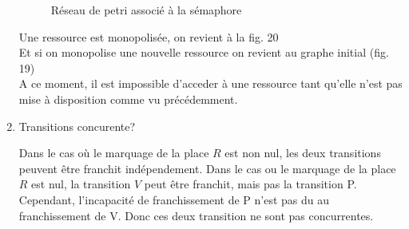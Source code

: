 \begin{enumerate}
\begin{figure}[H]
  \caption{Réseau de petri associé à la sémaphore} \label{fig:M1}
\end{figure}

Une ressource est monopolisée, on revient à la fig. 20\\
Et si on monopolise une nouvelle ressource on revient au graphe initial (fig. 19)\\
A ce moment, il est impossible d'acceder à une ressource tant qu'elle n'est pas mise à disposition comme vu précédemment.

\item Transitions concurente?

Dans le cas où le marquage de la place $R$ est non nul, les deux transitions peuvent être franchit indépendement.
Dans le cas ou le marquage de la place $R$ est nul, la transition $V$ peut être franchit, mais pas la transition P.
Cependant, l'incapacité de franchissement de P n'est pas du au franchissement de V.
Donc ces deux transition ne sont pas concurrentes.


\end{enumerate}
